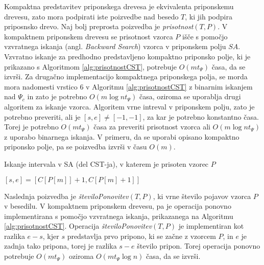 Kompaktna predstavitev priponskega drevesa je ekvivalenta priponskemu drevesu, zato mora podpirati iste poizvedbe nad besedo $T$, ki jih podpira priposnsko drevo. Naj bolj preprosta poizvedba je \textit{prisotnost}$(T,P)$. V kompaktnem priponskem drevesu se prisotnost vzorca $P$ išče s pomočjo vzvratnega iskanja (angl. \textit{Backward Search}) vzorca v priponskem polju $SA$. Vzvratno iskanje za predhodno predstavljeno kompaktno priponsko polje, ki je prikazano s Algoritmom \ref{alg:prisotnostCST}, potrebuje $O(mt_\Psi)$ časa, da se izvrši. Za drugačno implementacijo kompaktnega priponskega polja, se morda mora nadomesti vrstico 6 v Algoritmu \ref{alg:prisotnostCST} z binarnim iskanjem nad $\Psi_c$ in zato je potrebno $O(m\log{n}t_\Psi)$ časa, oziroma se uporablja drugi algoritem za iskanje vzorca. Algoritem vrne intreval v priponskem polju, zato je potrebno preveriti, ali je $[s,e]\ne[-1,-1]$, za kar je potrebno konstantno časa. Torej je potrebno $O(mt_\Psi)$ časa za preveriti prisotnost vzorca ali $O(m\log{n}t_\Psi)$ z uporabo binarnega iskanja. V primeru, da se uporabi opisano kompaktno priponsko polje, pa se poizvedba izvrši v času $O(m)$. 

\begin{algorithm}[tb]

\caption{Iskanje intervala v SA (del CST-ja), v katerem je prisoten vzorec $P$ \cite{Navarro2016}}\label{alg:prisotnostCST}
{
    {$[s,e]=[C[P[m]]+1,C[P[m]+1]]$}
    

    {\KwRet{$[s,e]$}}
}

\end{algorithm}


Naslednja poizvedba je \textit{številoPonovitev}$(T,P)$, ki vrne  število pojavov vzorca $P$ v besedilu. V kompaktnem priponskem drevesu, pa je operacija ponovno implementirana s pomočjo vzvratnega iskanja, prikazanega na Algoritmu \ref{alg:prisotnostCST}. Operacija \textit{številoPonovitev}$(T,P)$ je implementiran kot razlika $e-s$, kjer $s$ predstavlja prvo pripono, ki se začne z vzorcem $P$, in $e$ je zadnja tako pripona, torej je razlika $s-e$ število pripon. Torej operacija ponovno potrebuje $O(mt_\Psi)$ oziroma $O(mt_\Psi\log{n})$ časa, da se izvrši.

